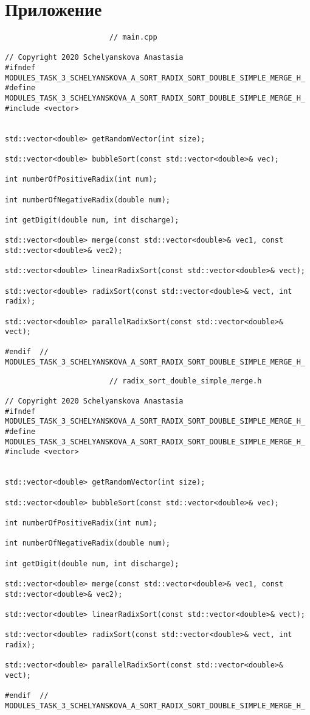 \documentclass{report}
\begin{document}
\section*{Приложение}
\begin{lstlisting}
						// main.cpp

// Copyright 2020 Schelyanskova Anastasia
#ifndef MODULES_TASK_3_SCHELYANSKOVA_A_SORT_RADIX_SORT_DOUBLE_SIMPLE_MERGE_H_
#define MODULES_TASK_3_SCHELYANSKOVA_A_SORT_RADIX_SORT_DOUBLE_SIMPLE_MERGE_H_
#include <vector>


std::vector<double> getRandomVector(int size);

std::vector<double> bubbleSort(const std::vector<double>& vec);

int numberOfPositiveRadix(int num);

int numberOfNegativeRadix(double num);

int getDigit(double num, int discharge);

std::vector<double> merge(const std::vector<double>& vec1, const std::vector<double>& vec2);
 
std::vector<double> linearRadixSort(const std::vector<double>& vect);
 
std::vector<double> radixSort(const std::vector<double>& vect, int radix);

std::vector<double> parallelRadixSort(const std::vector<double>& vect);

#endif  // MODULES_TASK_3_SCHELYANSKOVA_A_SORT_RADIX_SORT_DOUBLE_SIMPLE_MERGE_H_
\end{lstlisting}
\begin{lstlisting}
						// radix_sort_double_simple_merge.h

// Copyright 2020 Schelyanskova Anastasia
#ifndef MODULES_TASK_3_SCHELYANSKOVA_A_SORT_RADIX_SORT_DOUBLE_SIMPLE_MERGE_H_
#define MODULES_TASK_3_SCHELYANSKOVA_A_SORT_RADIX_SORT_DOUBLE_SIMPLE_MERGE_H_
#include <vector>


std::vector<double> getRandomVector(int size);

std::vector<double> bubbleSort(const std::vector<double>& vec);

int numberOfPositiveRadix(int num);

int numberOfNegativeRadix(double num);

int getDigit(double num, int discharge);

std::vector<double> merge(const std::vector<double>& vec1, const std::vector<double>& vec2);

std::vector<double> linearRadixSort(const std::vector<double>& vect);

std::vector<double> radixSort(const std::vector<double>& vect, int radix);

std::vector<double> parallelRadixSort(const std::vector<double>& vect);

#endif  // MODULES_TASK_3_SCHELYANSKOVA_A_SORT_RADIX_SORT_DOUBLE_SIMPLE_MERGE_H_

\end{lstlisting}
\end{document}
